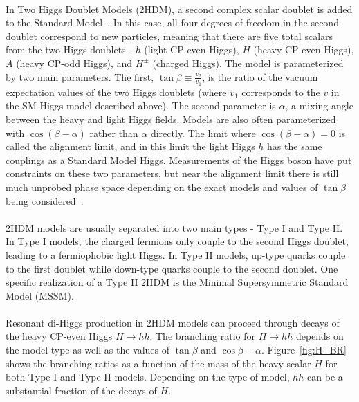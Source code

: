 \paragraph{}
In Two Higgs Doublet Models (2HDM), a second complex scalar doublet is added to the Standard Model~\cite{HH_2HDM,2HDM2,2HDM3}. In this case, all four degrees of freedom in the second doublet correspond to new particles, meaning that there are five total scalars from the two Higgs doublets - $h$ (light CP-even Higgs), $H$ (heavy CP-even Higgs), $A$ (heavy CP-odd Higgs), and $H^{\pm}$ (charged Higgs). The model is parameterized by two main parameters. The first, $\tan{\beta} \equiv \frac{v_2}{v_1}$, is the ratio of the vacuum expectation values of the two Higgs doublets (where $v_1$ corresponds to the $v$ in the SM Higgs model described above). The second parameter is $\alpha$, a mixing angle between the heavy and light Higgs fields. Models are also often parameterized with $\cos(\beta - \alpha)$ rather than $\alpha$ directly. The limit where $\cos(\beta - \alpha) = 0$ is called the alignment limit, and in this limit the light Higgs $h$ has the same couplings as a Standard Model Higgs. Measurements of the Higgs boson have put constraints on these two parameters, but near the alignment limit there is still much unprobed phase space depending on the exact models and values of $\tan{\beta}$ being considered~\cite{HiggsNewPhysics}.
\paragraph{}
2HDM models are usually separated into two main types - Type I and Type II. In Type I models, the charged fermions only couple to the second Higgs doublet, leading to a fermiophobic light Higgs. In Type II models, up-type quarks couple to the first doublet while down-type quarks couple to the second doublet. One specific realization of a Type II 2HDM is the Minimal Supersymmetric Standard Model (MSSM).
\paragraph{}
Resonant di-Higgs production in 2HDM models can proceed through decays of the heavy CP-even Higgs $H\to hh$. The branching ratio for $H\to hh$ depends on the model type as well as the values of $\tan{\beta}$ and $\cos{\beta - \alpha}$. Figure~\ref{fig:H_BR} shows the branching ratios as a function of the mass of the heavy scalar $H$ for both Type I and Type II models. Depending on the type of model, $hh$ can be a substantial fraction of the decays of $H$. 

